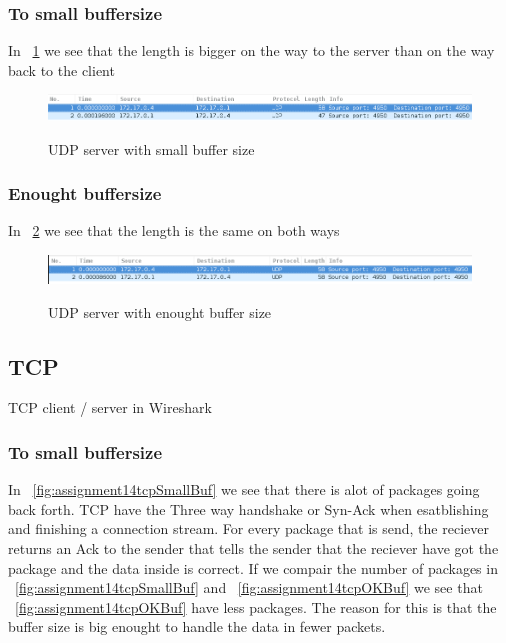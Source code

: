 \documentclass[a4paper,12pt]{article} %
\begin{document}
{\subsubsection{To small buffersize}
In ~\ref{fig:assignment14udpSmallBuf} we see that the length is bigger on
the way to the server than on the way back to the client

\begin{figure}[H]
    \centering  
    \includegraphics[scale=0.43]{img/assignment14udpSmallBuf.png}
	\label{fig:assignment14udpSmallBuf}
	\caption{UDP server with small buffer size}
\end{figure}


\subsubsection{Enought buffersize}
In ~\ref{fig:assignment14udpOKBuf} we see that the length is the same on both ways

\begin{figure}[H]
    \centering  
    \includegraphics[scale=0.43]{img/assignment14udpOKBuf.png}
	\label{fig:assignment14udpOKBuf}
	\caption{UDP server with enought buffer size}
\end{figure}


\clearpage

\subsection{TCP}
TCP client / server in Wireshark
\subsubsection{To small buffersize}
In ~\ref{fig:assignment14tcpSmallBuf} we see that there is alot of packages going back
forth.
TCP have the Three way handshake or Syn-Ack when esatblishing and finishing a connection stream. For every package that is send, the reciever returns an Ack to the sender that tells the sender that the reciever have got the package and the data inside is correct.
If we compair the number of packages in ~\ref{fig:assignment14tcpSmallBuf} and ~\ref{fig:assignment14tcpOKBuf} we see that ~\ref{fig:assignment14tcpOKBuf} have less packages. The reason for this is that the buffer size is big enought to handle the data in fewer packets.

}
\end{document}
